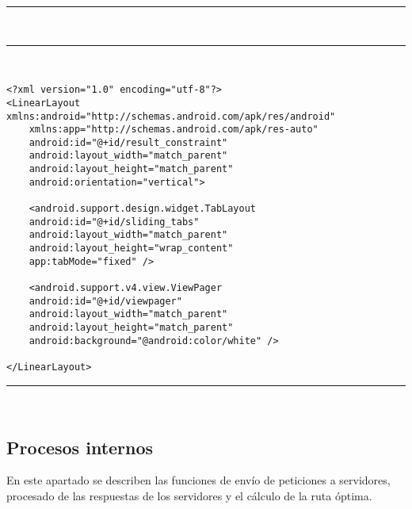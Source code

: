 \noindent\rule[-1ex]{\textwidth}{1pt}\\
\newpage
\noindent\rule[-1ex]{\textwidth}{1pt}\\
\begin{lstlisting}[caption=Código XML de la vista con tabs.]
<?xml version="1.0" encoding="utf-8"?>
<LinearLayout xmlns:android="http://schemas.android.com/apk/res/android"
	xmlns:app="http://schemas.android.com/apk/res-auto"
	android:id="@+id/result_constraint"
	android:layout_width="match_parent"
	android:layout_height="match_parent"
	android:orientation="vertical">

	<android.support.design.widget.TabLayout
	android:id="@+id/sliding_tabs"
	android:layout_width="match_parent"
	android:layout_height="wrap_content"
	app:tabMode="fixed" />
	
	<android.support.v4.view.ViewPager
	android:id="@+id/viewpager"
	android:layout_width="match_parent"
	android:layout_height="match_parent"
	android:background="@android:color/white" />

</LinearLayout>
\end{lstlisting}
\noindent\rule[-1ex]{\textwidth}{1pt}\\

\subsection[Procesos internos]{Procesos internos}
En este apartado se describen las funciones de envío de peticiones a servidores, procesado de las respuestas de los servidores y el cálculo de la ruta óptima.
